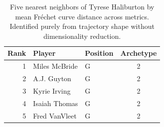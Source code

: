 \begin{table}[htbp]
  \centering\small
  \begin{tabular}{rllc}
    \toprule
    Rank & Player & Position & Archetype \\
    \midrule
    1 & Miles McBride & G & 2 \\
    2 & A.J. Guyton & G & 2 \\
    3 & Kyrie Irving & G & 2 \\
    4 & Isaiah Thomas & G & 2 \\
    5 & Fred VanVleet & G & 2 \\
    \bottomrule
  \end{tabular}
  \caption{Five nearest neighbors of Tyrese Haliburton by mean Fr\'{e}chet curve distance across metrics. Identified purely from trajectory shape without dimensionality reduction.}
  \label{tab:Tyrese_Haliburton_frechet_curve_neighbors}
\end{table}

